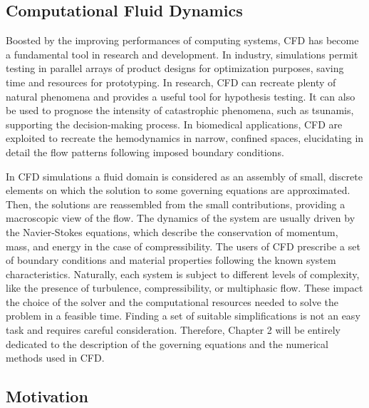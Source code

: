 \subsection{Computational Fluid Dynamics}
Boosted by the improving performances of computing systems, CFD has become a fundamental tool in research and development. In industry, simulations permit testing in parallel arrays of product designs for optimization purposes, saving time and resources for prototyping. In research, CFD can recreate plenty of natural phenomena and provides a useful tool for hypothesis testing. It can also be used to prognose the intensity of catastrophic phenomena, such as tsunamis, supporting the decision-making process. In biomedical applications, CFD are exploited to recreate the hemodynamics in narrow, confined spaces, elucidating in detail the flow patterns following imposed boundary conditions.

In CFD simulations a fluid domain is considered as an assembly of small, discrete elements on which the solution to some governing equations are approximated. Then, the solutions are reassembled from the small contributions, providing a macroscopic view of the flow. The dynamics of the system are usually driven by the Navier-Stokes equations, which describe the conservation of momentum, mass, and energy in the case of compressibility. The users of CFD prescribe a set of boundary conditions and material properties following the known system characteristics. Naturally, each system is subject to different levels of complexity, like the presence of turbulence, compressibility, or multiphasic flow. These impact the choice of the solver and the computational resources needed to solve the problem in a feasible time. Finding a set of suitable simplifications is not an easy task and requires careful consideration. Therefore, Chapter 2 will be entirely dedicated to the description of the governing equations and the numerical methods used in CFD\@.

\subsection{Motivation}
